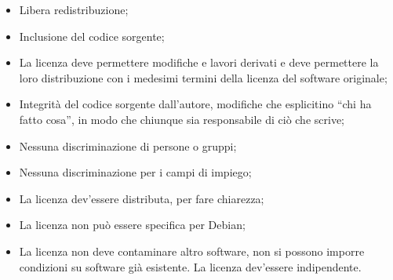 \begin{itemize}

\item Libera redistribuzione;
\item Inclusione del codice sorgente;
\item La licenza deve permettere modifiche e lavori derivati e deve permettere la loro distribuzione con i medesimi termini della licenza del software originale;
\item Integrità del codice sorgente dall'autore, modifiche che esplicitino ``chi ha fatto cosa'', in modo che chiunque sia responsabile di ciò che scrive;
\item Nessuna discriminazione di persone o gruppi;
\item Nessuna discriminazione per i campi di impiego;
\item La licenza dev'essere distributa, per fare chiarezza;
\item La licenza non può essere specifica per Debian;
\item La licenza non deve contaminare altro software, non si possono imporre condizioni su software già esistente. La licenza dev'essere indipendente.

\end{itemize}

